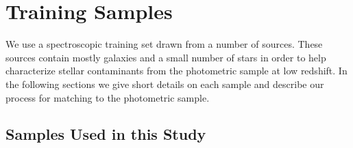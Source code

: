 \documentclass[12pt,preprint]{aastex}
\begin{document}
\section{Training Samples} \label{sec:train}

We use a spectroscopic training set drawn from a number of sources. These
sources contain mostly galaxies and a small number of stars in order to help
characterize stellar contaminants from the photometric sample at low redshift.
In the following sections we give short details on each sample and describe our
process for matching to the photometric sample.

\subsection{Samples Used in this Study} \label{sec:train:def}
\end{document}
